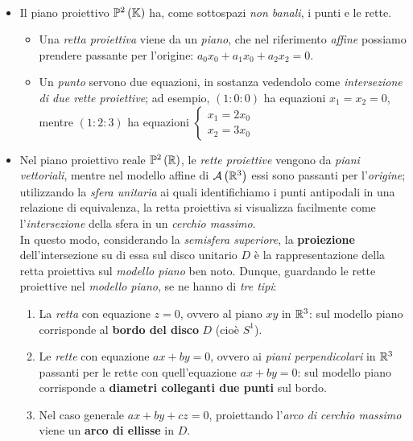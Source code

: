 \begin{examples}~{}
	\begin{itemize}
		\item Il piano proiettivo $\proj[2]{\kamp}$ ha, come sottospazi \textit{non banali}, i punti e le rette.
		\begin{itemize}
			\item Una \textit{retta proiettiva} viene da un \textit{piano}, che nel riferimento \textit{affine} possiamo prendere passante per l'origine: $a_0x_0+a_1x_0+a_2x_2=0$.
			\item Un \textit{punto} servono due equazioni, in sostanza vedendolo come \textit{intersezione di due rette proiettive}; ad esempio, $\left(1\colon0\colon0\right)$ ha equazioni $x_1=x_2=0$, mentre $\left(1\colon2\colon3\right)$ ha equazioni $\begin{cases}
				x_1=2x_0\\
				x_2=3x_0
			\end{cases}$
		\end{itemize}
	\item Nel piano proiettivo reale $\proj[2]{\realset}$, le \textit{rette proiettive} vengono da \textit{piani vettoriali}, mentre nel modello affine di $\mathcal{A}\left(\mathbb{R}^3\right)$ essi sono passanti per l'\textit{origine}; utilizzando la \textit{sfera unitaria} ai quali identifichiamo i punti antipodali in una relazione di equivalenza, la retta proiettiva si visualizza facilmente come l'\textit{intersezione} della sfera in un \textit{cerchio massimo}.\\
	In questo modo, considerando la \textit{semisfera superiore}, la \textbf{proiezione} dell'intersezione su di essa sul disco unitario $D$ è la rappresentazione della retta proiettiva sul \textit{modello piano} ben noto. Dunque, guardando le rette proiettive nel \textit{modello piano}, se ne hanno di \textit{tre tipi}:
	\begin{enumerate}
		\item La \textit{retta} con equazione $z=0$, ovvero al piano $xy$ in $\mathbb{R}^3$: sul modello piano corrisponde al \textbf{bordo del disco} $D$ (cioè $S^1$).
		\item Le \textit{rette} con equazione $ax+by=0$, ovvero ai \textit{piani perpendicolari} in $\mathbb{R}^3$ passanti per le rette con quell'equazione $ax+by=0$:  sul modello piano corrisponde a \textbf{diametri colleganti due punti} sul bordo.
		\item Nel caso generale $ax+by+cz=0$, proiettando l'\textit{arco di cerchio massimo} viene un \textbf{arco di ellisse} in $D$.

\end{enumerate}
\end{itemize}
\end{examples}

